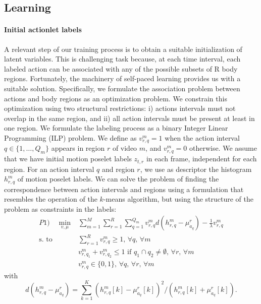 \subsection{Learning} \label{subsec:learning}

\paragraph{Initial actionlet labels }A relevant step of our training process is to obtain a suitable initialization 
of latent variables. This is challenging task because, at each time 
interval, each labeled action can be associated with any of the possible 
subsets of R body regions. Fortunately, the machinery of self-paced 
learning \cite{Kumar:EtAl:2010} provides us with a suitable solution. Specifically, we 
formulate the association problem between actions and body regions as an 
optimization problem. We constrain this optimization using two structural 
restrictions: i) actions intervals must not overlap in the same region, and 
ii) all action 
intervals must be present at least in one region. We formulate the labeling 
process as a binary Integer Linear Programming (ILP) problem. We define as 
$v_{r,q}^m=1$ when the action interval $q \in \{1,\dots,Q_m\}$ appears in 
region 
$r$ of video $m$, and $v_{r,q}^m=0$ otherwise. We assume that we have initial 
motion poselet 
labels 
$z_{t,r}$ in each frame, independent for each region. For an action interval $q$ and region $r$, we use as 
descriptor the histogram $h_{r,q}^m$ of motion poselet labels. We can solve the problem of finding 
the correspondence between action intervals and regions using a formulation 
that resembles the operation of the $k$-means algorithm, but using the 
structure of the problem as constraints in the labels:
\begin{equation}
\begin{split}
P1) \quad \min_{v,\mu} &\sum_{m=1}^M  \sum_{r=1}^R \sum_{q=1}^{Q_m}  v_{r,q}^m 
d( h_{r,q}^m - \mu_{a_q}^r) -\frac{1}{\lambda} v_{r,q}^m\\ 
 \text{s. to} 
\quad 
& \sum_{r=1}^R v_{r,q}^m \ge 1\text{, }\forall q\text{, }\forall m \\ 
& v_{r,q_1}^m + v_{r,q_2}^m \le 1 \text{ if } q_1\cap q_2 \neq \emptyset 
\text{, 
}\forall r\text{, }\forall m\\  
& v_{r,q}^m \in \{0,1\}\text{, }\forall q\text{, }\forall{r}\text{, }\forall m
\end{split}
\end{equation}
with
\begin{equation}
d( h_{r,q}^m - \mu_{a_q}^r) = \sum_{k=1}^K (h_{r,q}^m[k] - 
\mu_{a_q}^r[k])^2/(h_{r,q}^m[k] +\mu_{a_q}^r[k]).
\end{equation}

